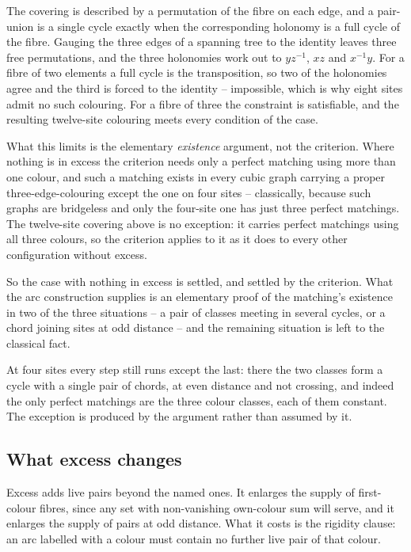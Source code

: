 \documentclass[11pt]{article}
\theoremstyle{definition}
\theoremstyle{remark}
\begin{document}
The covering is described by a permutation of the fibre on each edge, and a pair-union is a single
cycle exactly when the corresponding holonomy is a full cycle of the fibre.  Gauging the three edges
of a spanning tree to the identity leaves three free permutations, and the three holonomies work out
to $yz^{-1}$, $xz$ and $x^{-1}y$.  For a fibre of two elements a full cycle is the transposition, so
two of the holonomies agree and the third is forced to the identity -- impossible, which is why eight
sites admit no such colouring.  For a fibre of three the constraint is satisfiable, and the resulting
twelve-site colouring meets every condition of the case.

What this limits is the elementary \emph{existence} argument, not the criterion.  Where nothing is in
excess the criterion needs only a perfect matching using more than one colour, and such a matching
exists in every cubic graph carrying a proper three-edge-colouring except the one on four sites --
classically, because such graphs are bridgeless and only the four-site one has just three perfect
matchings.  The twelve-site covering above is no exception: it carries perfect matchings using all
three colours, so the criterion applies to it as it does to every other configuration without excess.

So the case with nothing in excess is settled, and settled by the criterion.  What the arc
construction supplies is an elementary proof of the matching's existence in two of the three
situations -- a pair of classes meeting in several cycles, or a chord joining sites at odd distance --
and the remaining situation is left to the classical fact.

At four sites every step still runs except the last: there the two classes form a cycle with a single
pair of chords, at even distance and not crossing, and indeed the only perfect matchings are the three
colour classes, each of them constant.  The exception is produced by the argument rather than assumed
by it.

\subsection*{What excess changes}

Excess adds live pairs beyond the named ones.  It enlarges the supply of first-colour fibres, since
any set with non-vanishing own-colour sum will serve, and it enlarges the supply of pairs at odd
distance.  What it costs is the rigidity clause: an arc labelled with a colour must contain no further
live pair of that colour.
\end{document}
